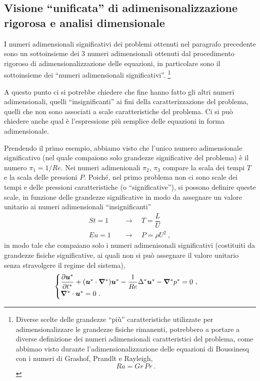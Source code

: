 \subsection{Visione ``unificata'' di adimenisonalizzazione rigorosa e analisi dimensionale}
I numeri adimensionali significativi dei problemi ottenuti nel paragrafo precedente sono un sottoinsieme dei 3 numeri adimensionali ottenuti dal procedimento rigoroso di adimensionalizzazione delle equazioni, in particolare sono il sottoinsieme dei ``numeri adimensionali significativi''.
\footnote{
 Diverse scelte delle grandezze ``più'' caratteristiche utilizzate per adimensionalizzare le grandezze fisiche rimanenti, potrebbero a portare a diverse definizione dei numeri adimensionali caratteristici del problema, come abbimao visto durante l'adimensionalizzazione delle equazioni di Boussinesq con i numeri di Grashof, Prandlt e Rayleigh,
\begin{equation}
  Ra = Gr \, Pr \ .
\end{equation}
}

A questo punto ci si potrebbe chiedere che fine hanno fatto gli altri numeri adimensionali, quelli ``insignificanti'' ai fini della caratterizzazione del problema, quelli che non sono associati a scale caratteristiche del problema.
Ci si può chiedere anche qual è l'espressione più semplice delle equazioni in forma adimensionale.

Prendendo il primo esempio, abbiamo visto che l'unico numero adimensionale significativo (nel quale compaiono solo grandezze significative del problema) è il numero $\pi_1 = 1/Re$. Nei numeri adimenionali $\pi_2$, $\pi_3$ compare la scala dei tempi $T$ e la scala delle pressioni $P$. Poiché, nel primo problema non ci sono scale dei tempi e delle pressioni caratteristiche (o ``significative''), si possono definire queste scale, in funzione delle grandezze significative in modo da assegnare un valore unitario ai numeri adimensionali ``insignificanti''
\begin{equation}
\begin{aligned}
 St = 1 \quad & \rightarrow \quad T = \dfrac{L}{U} \\
 Eu = 1 \quad & \rightarrow \quad P = \rho U^ 2    \ ,
\end{aligned}
\end{equation}
in modo tale che compaiano solo i numeri adimenisonali significativi (costituiti da grandezze fisiche significative, ai quali non si può assegnare il valore unitario senza stravolgere il regime del sistema),
\begin{equation}
\begin{cases}
 \dfrac{\partial{\bm{u}^*}}{\partial{t^*}} + ( \bm{u}^* \cdot \bm{\nabla}^* ) \bm{u}^* 
 - \dfrac{1}{Re} \Delta^* \bm{u}^* - \bm{\nabla}^* p^* = 0 \ , \\
 \bm{\nabla}^* \cdot \bm{u}^* = 0 \ .
\end{cases}
\end{equation}

